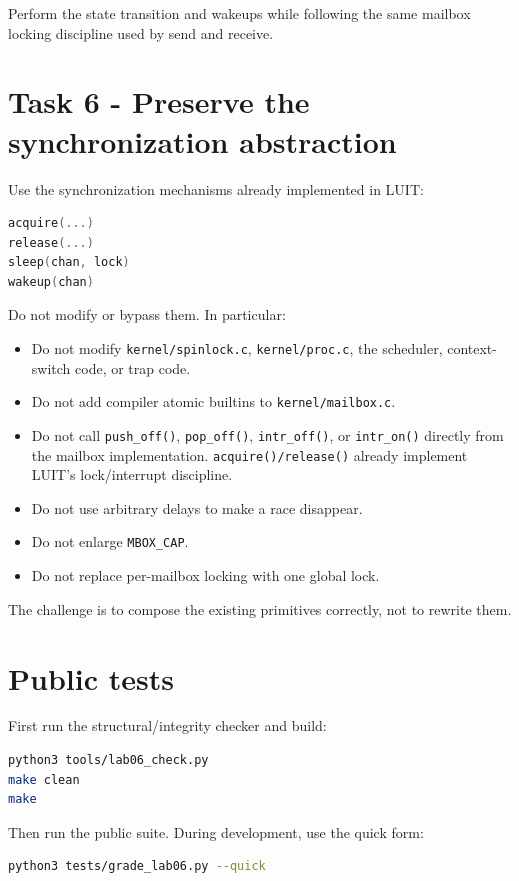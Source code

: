 \documentclass[11pt,a4paper]{article}
\newcommand{\file}[1]{\texttt{#1}}
\begin{document}
Perform the state transition and wakeups while following the same mailbox locking discipline used by send and receive.

\section{Task 6 - Preserve the synchronization abstraction}

Use the synchronization mechanisms already implemented in LUIT:

\begin{lstlisting}[language=C]
acquire(...)
release(...)
sleep(chan, lock)
wakeup(chan)
\end{lstlisting}

Do not modify or bypass them. In particular:

\begin{itemize}[leftmargin=7mm]
\item Do not modify \file{kernel/spinlock.c}, \file{kernel/proc.c}, the scheduler, context-switch code, or trap code.
\item Do not add compiler atomic builtins to \file{kernel/mailbox.c}.
\item Do not call \file{push\_off()}, \file{pop\_off()}, \file{intr\_off()}, or \file{intr\_on()} directly from the mailbox implementation. \file{acquire()/release()} already implement LUIT's lock/interrupt discipline.
\item Do not use arbitrary delays to make a race disappear.
\item Do not enlarge \file{MBOX\_CAP}.
\item Do not replace per-mailbox locking with one global lock.
\end{itemize}

The challenge is to compose the existing primitives correctly, not to rewrite them.

\section{Public tests}

First run the structural/integrity checker and build:

\begin{lstlisting}[language=bash]
python3 tools/lab06_check.py
make clean
make
\end{lstlisting}

Then run the public suite. During development, use the quick form:

\begin{lstlisting}[language=bash]
python3 tests/grade_lab06.py --quick
\end{lstlisting}
\end{document}
